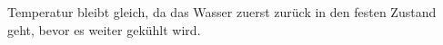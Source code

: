 Temperatur bleibt gleich, da das Wasser zuerst zurück in den festen Zustand geht, bevor es weiter gekühlt wird.